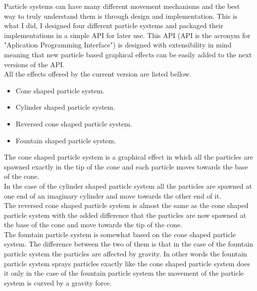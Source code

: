 Particle systems can have many different movement mechanisms and the best way to truly understand them is through design and implementation. This is what I did, I designed four different particle systems and packaged their implementations in a simple API for later use. This API (API is the acronym for "Aplication Programming Interface") is designed with extensibility in mind meaning that new particle based graphical effects can be easily added to the next versions of the API.\\

All the effects offered by the current version are listed bellow.

\begin{itemize}
	\item Cone shaped particle system.
	
	\item Cylinder shaped particle system.
	
	\item Reversed cone shaped particle system.
	
	\item Fountain shaped particle system.
\end{itemize}

The cone shaped particle system is a graphical effect in which all the particles are spawned exactly in the tip of the cone and each particle moves towards the base of the cone.\\

In the case of the cylinder shaped particle system all the particles are spawned at one end of an imaginary cylinder and move towards the other end of it.\\

The reversed cone shaped particle system is almost the same as the cone shaped particle system with the added difference that the particles are now spawned at the base of the cone and move towards the tip of the cone.\\

\newpage
The fountain particle system is somewhat based on the cone shaped particle system. The difference between the two of them is that in the case of the fountain particle system the particles are affected by gravity. In other words the fountain particle system sprays particles exactly like the cone shaped particle system does it only in the case of the fountain particle system the movement of the particle system is curved by a gravity force.\\

